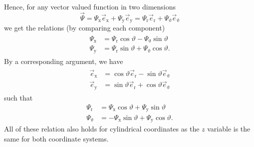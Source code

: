 Hence, for any vector valued function in two dimensions
\begin{equation*}
	\vec{\Psi} = \Psi_{\mathrm{x}}\vec{e}_{\mathrm{x}} + \Psi_{\mathrm{y}}\vec{e}_{\mathrm{y}} = \Psi_{\mathrm{r}}\vec{e}_{\mathrm{r}} + \Psi_{\upvartheta}\vec{e}_{\upvartheta}
\end{equation*}
we get the relations (by comparing each component)
\begin{align}
\label{Eq2:PolarToXfun}
\begin{split}
	\Psi_{\mathrm{x}} &= \Psi_{\mathrm{r}}\cos\vartheta - \Psi_{\upvartheta}\sin\vartheta\\
	\Psi_{\mathrm{y}} &= \Psi_{\mathrm{r}}\sin\vartheta + \Psi_{\upvartheta}\cos\vartheta.
\end{split}
\end{align}
By a corresponding argument, we have
\begin{align}
\label{Eq2:XtoPolar}
\begin{split}
	\vec{e}_{\mathrm{x}} &= \cos\vartheta\vec{e}_{\mathrm{r}} - \sin\vartheta\vec{e}_{\upvartheta}\\
	\vec{e}_{\mathrm{y}} &= \sin\vartheta\vec{e}_{\mathrm{r}}+\cos\vartheta\vec{e}_{\upvartheta}
\end{split}
\end{align}
such that
\begin{align*}
	\Psi_{\mathrm{r}} &= \Psi_{\mathrm{x}}\cos\vartheta + \Psi_{\mathrm{y}}\sin\vartheta\\
	\Psi_{\upvartheta} &= -\Psi_{\mathrm{x}}\sin\vartheta + \Psi_{\mathrm{y}}\cos\vartheta.
\end{align*}
All of these relation also holds for cylindrical coordinates as the $z$ variable is the same for both coordinate systems.

